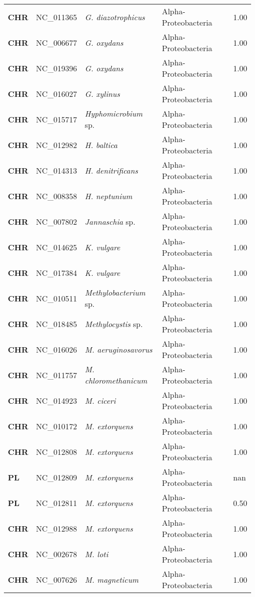 \begin{adjustwidth}{-3cm}{2cm}
{\begin{supertabular}{>{\bfseries}l|p{0.1\textwidth}p{0.14\textwidth}l|l}
CHR & NC\_011365 & \textit{G. diazotrophicus} & Alpha-Proteobacteria & 1.00\\
CHR & NC\_006677 & \textit{G. oxydans} & Alpha-Proteobacteria & 1.00\\
CHR & NC\_019396 & \textit{G. oxydans} & Alpha-Proteobacteria & 1.00\\
CHR & NC\_016027 & \textit{G. xylinus} & Alpha-Proteobacteria & 1.00\\
CHR & NC\_015717 & \textit{Hyphomicrobium} sp. & Alpha-Proteobacteria & 1.00\\
CHR & NC\_012982 & \textit{H. baltica} & Alpha-Proteobacteria & 1.00\\
CHR & NC\_014313 & \textit{H. denitrificans} & Alpha-Proteobacteria & 1.00\\
CHR & NC\_008358 & \textit{H. neptunium} & Alpha-Proteobacteria & 1.00\\
CHR & NC\_007802 & \textit{Jannaschia} sp. & Alpha-Proteobacteria & 1.00\\
CHR & NC\_014625 & \textit{K. vulgare} & Alpha-Proteobacteria & 1.00\\
CHR & NC\_017384 & \textit{K. vulgare} & Alpha-Proteobacteria & 1.00\\
CHR & NC\_010511 & \textit{Methylobacterium} sp. & Alpha-Proteobacteria & 1.00\\
CHR & NC\_018485 & \textit{Methylocystis} sp. & Alpha-Proteobacteria & 1.00\\
CHR & NC\_016026 & \textit{M. aeruginosavorus} & Alpha-Proteobacteria & 1.00\\
CHR & NC\_011757 & \textit{M. chloromethanicum} & Alpha-Proteobacteria & 1.00\\
CHR & NC\_014923 & \textit{M. ciceri} & Alpha-Proteobacteria & 1.00\\
CHR & NC\_010172 & \textit{M. extorquens} & Alpha-Proteobacteria & 1.00\\
CHR & NC\_012808 & \textit{M. extorquens} & Alpha-Proteobacteria & 1.00\\
PL & NC\_012809 & \textit{M. extorquens} & Alpha-Proteobacteria & nan\\
PL & NC\_012811 & \textit{M. extorquens} & Alpha-Proteobacteria & 0.50\\
CHR & NC\_012988 & \textit{M. extorquens} & Alpha-Proteobacteria & 1.00\\
CHR & NC\_002678 & \textit{M. loti} & Alpha-Proteobacteria & 1.00\\
CHR & NC\_007626 & \textit{M. magneticum} & Alpha-Proteobacteria & 1.00\\

\end{supertabular}}
\end{adjustwidth}
